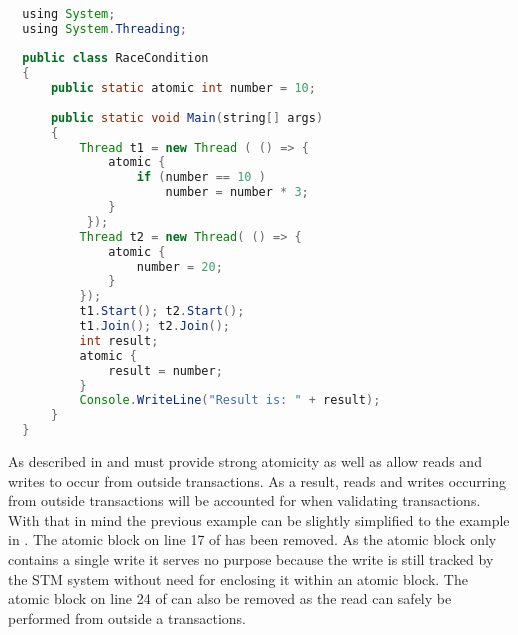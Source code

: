 \begin{lstlisting}[label=lst:stm_atomic_syntax,
  caption={Transaction Syntax},
  language=Java,  
  showspaces=false,
  showtabs=false,
  breaklines=true,
  showstringspaces=false,
  breakatwhitespace=true,
  commentstyle=\color{greencomments},
  keywordstyle=\color{bluekeywords},
  stringstyle=\color{redstrings},
  morekeywords={atomic, retry, orElse, var, get, set, using}]  % Start your code-block

  using System;
  using System.Threading;
  
  public class RaceCondition
  {
      public static atomic int number = 10;
  
      public static void Main(string[] args)
      {
          Thread t1 = new Thread ( () => {
              atomic {
                  if (number == 10 )           
                      number = number * 3;
              }
           });
          Thread t2 = new Thread( () => {
              atomic {
                  number = 20;
              }
          });
          t1.Start(); t2.Start();
          t1.Join(); t2.Join();
          int result;
          atomic {
              result = number;          
          }
          Console.WriteLine("Result is: " + result);
      }
  }
\end{lstlisting}

As described in  and  \stmnamesp must provide strong atomicity as well as allow reads and writes to occur from outside transactions. As a result, reads and writes occurring from outside transactions will be accounted for when validating transactions. With that in mind the previous example can be slightly simplified to the example in . The atomic block on line 17 of  has been removed. As the atomic block only contains a single write it serves no purpose because the write is still tracked by the \ac{STM} system without need for enclosing it within an atomic block. The atomic block on line 24 of  can also be removed as the read can safely be performed from outside a transactions.


